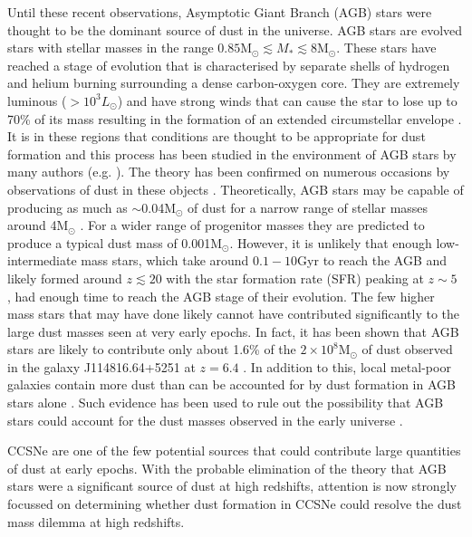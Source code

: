 Until these recent observations, Asymptotic Giant Branch (AGB) stars were thought to be the dominant source of dust in the universe.  AGB stars are evolved stars with stellar masses in the range $0.85$M$_{\odot} \lesssim M_{*} \lesssim 8$M$_{\odot}$.  These stars have reached a stage of evolution that is characterised by separate shells of hydrogen and helium burning surrounding a dense carbon-oxygen core. They are extremely luminous ($>10^3L_{\odot}$) and have strong winds that can cause the star to lose up to 70\% of its mass resulting in the formation of an extended circumstellar envelope \citep{Wood2004a}.  It is in these regions that conditions are thought to be appropriate for dust formation and this process has been studied in the environment of AGB stars by many authors (e.g. \citet{Gail1999,Cherchneff2000,Ferrarotti2005}).  The theory has been confirmed on numerous occasions by observations of dust  in these objects \citep{Meixner2006,Matsuura2009,Sloan2009,Boyer2011,Boyer2012,Riebel2012,Matsuura2013}. Theoretically, AGB stars may be capable of producing as much as $\sim$0.04M$_{\odot}$ of dust for a narrow range of stellar masses around 4M$_{\odot}$ \citep{Ferrarotti2006}.  For a wider range of progenitor masses they are predicted to produce a typical dust mass of 0.001M$_{\odot}$. However, it is unlikely that enough low-intermediate mass stars, which take around $0.1-10$Gyr to reach the AGB \citep{Salaris2014} and likely formed around $z\lesssim20$ with the star formation rate (SFR) peaking at $z\sim5$ \citep{Greif2006}, had enough time to reach the AGB stage of their evolution.  The few higher mass stars that may have done likely cannot have contributed significantly to the large dust masses seen at very early epochs.  In fact, it has been shown that AGB stars are likely to contribute only about 1.6\% of the $2\times 10^8$M$_{\odot}$ of dust observed in the galaxy J114816.64+5251 at $z=6.4$ \citep{Dwek2007}.  In addition to this, local metal-poor galaxies contain more dust than can be accounted for by dust formation in AGB stars alone \citep{Matsuura2009,Matsuura2013}.  Such evidence has been used to rule out the possibility that AGB stars could account for the dust masses observed in the early universe \citep{Michalowski2015}.

CCSNe are one of the few potential sources that could contribute large quantities of dust at early epochs.  With the probable elimination of the theory that AGB stars were a significant source of dust at high redshifts, attention is now strongly focussed on determining whether dust formation in CCSNe could resolve the dust mass dilemma  at high redshifts.

